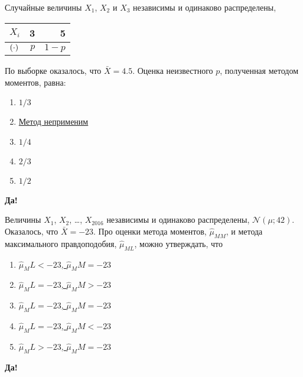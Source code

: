 \documentclass[t]{beamer}
\let\P\relax
\DeclareMathOperator{\P}{\mathbb{P}}
\newcommand{\cN}{\mathcal{N}}
\begin{document}
 \begin{frame} \label{33-Yes} 
\begin{block}{33} 

    Случайные величины $X_1$, $X_2$ и $X_3$ независимы и одинаково распределены,

\begin{center}
    \begin{tabular}{lrr} \toprule
    $X_i$ & 3 & 5 \\
    \midrule
    $\P(\cdot)$ & $p$ & $1-p$ \\
    \bottomrule
    \end{tabular}
\end{center}

    По выборке оказалось, что $\bar X = 4.5$. Оценка неизвестного $p$, полученная методом моментов, равна:


    


 \end{block} 
\begin{enumerate} 
\item[] \hyperlink{33-No}{\beamergotobutton{} $1/3$}
\item[] \hyperlink{33-No}{\beamergotobutton{} Метод неприменим}
\item[] \hyperlink{33-Yes}{\beamergotobutton{} $1/4$}
\item[] \hyperlink{33-No}{\beamergotobutton{} $2/3$}
\item[] \hyperlink{33-No}{\beamergotobutton{} $1/2$}
\end{enumerate} 

 \textbf{Да!} 
 \hyperlink{34}{}\end{frame} 


 \begin{frame} \label{34-Yes} 
\begin{block}{34} 

  Величины $X_1$, $X_2$, \ldots, $X_{2016}$ независимы и одинаково распределены, $\cN(\mu ; 42)$. Оказалось, что $\bar X =  -23$. Про оценки метода моментов, $\hat \mu_{MM}$, и метода максимального правдоподобия, $\hat \mu_{ML}$, можно утверждать, что


 \end{block} 
\begin{enumerate} 
\item[] \hyperlink{34-No}{\beamergotobutton{} $\hat \mu_ML < -23$, $\hat\mu_MM = -23$}
\item[] \hyperlink{34-No}{\beamergotobutton{} $\hat \mu_ML = -23$, $\hat\mu_MM > -23$}
\item[] \hyperlink{34-Yes}{\beamergotobutton{} $\hat \mu_ML = -23$, $\hat\mu_MM = -23$}
\item[] \hyperlink{34-No}{\beamergotobutton{} $\hat \mu_ML = -23$, $\hat\mu_MM < -23$}
\item[] \hyperlink{34-No}{\beamergotobutton{} $\hat \mu_ML > -23$, $\hat\mu_MM = -23$}
\end{enumerate} 

 \textbf{Да!} 
 \hyperlink{35}{}\end{frame} 
\end{document}
